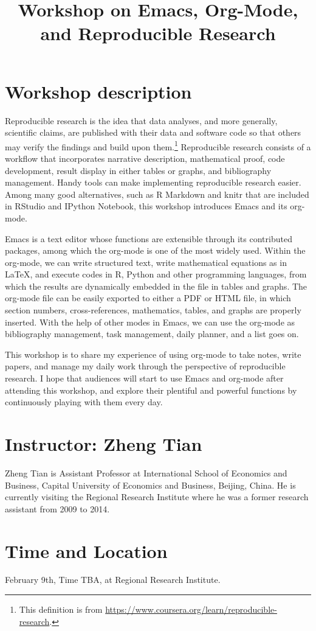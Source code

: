 \documentclass[11pt]{article}
\date{}
\title{Workshop on Emacs, Org-Mode, and Reproducible Research}
\begin{document}
\maketitle
\section*{Workshop description}
\label{sec:org0e62130}

Reproducible research is the idea that data analyses, and more
generally, scientific claims, are published with their data and
software code so that others may verify the findings and build upon
them.\footnote{This definition is from
\url{https://www.coursera.org/learn/reproducible-research}.} Reproducible research consists of a workflow that
incorporates narrative description, mathematical proof, code
development, result display in either tables or graphs, and
bibliography management. Handy tools can make implementing
reproducible research easier. Among many good alternatives, such as R
Markdown and knitr that are included in RStudio and IPython Notebook,
this workshop introduces Emacs and its org-mode.

Emacs is a text editor whose functions are extensible through its
contributed packages, among which the org-mode is one of the most
widely used. Within the org-mode, we can write structured text, write
mathematical equations as in \LaTeX{}, and execute codes in R, Python and
other programming languages, from which the results are dynamically
embedded in the file in tables and graphs. The org-mode file can be
easily exported to either a PDF or HTML file, in which section
numbers, cross-references, mathematics, tables, and graphs are
properly inserted. With the help of other modes in Emacs, we can use
the org-mode as bibliography management, task management, daily
planner, and a list goes on.

This workshop is to share my experience of using org-mode to take
notes, write papers, and manage my daily work through the perspective
of reproducible research. I hope that audiences will start to use
Emacs and org-mode after attending this workshop, and explore their
plentiful and powerful functions by continuously playing with them
every day.

\section*{Instructor: Zheng Tian}
\label{sec:orgda8e3bb}

Zheng Tian is Assistant Professor at International School of Economics and
Business, Capital University of Economics and Business, Beijing,
China. He is currently visiting the Regional Research Institute where
he was a former research assistant from 2009 to 2014.


\section*{Time and Location}
\label{sec:orgc62bfe4}

February 9th, Time TBA, at Regional Research Institute.
\end{document}
